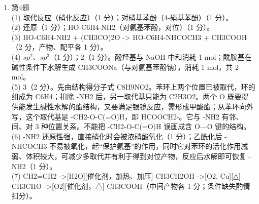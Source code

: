 \documentclass[UTF8,a4paper,zihao=5,oneside,openany,fontset=none]{ctexbook}
\def\mathrm#1{#1}\def\text#1{#1}\def\ensuremath#1{#1}\def\ce#1{#1}%
\renewcommand{\chaptermark}[1]{\markboth{第\,\thechapter\,章\quad #1}{}}
\newenvironment{jiexilist}{\small\begin{enumerate}[label={\textbf{\arabic*}.},leftmargin=1.6em,itemsep=0.3em,topsep=0.2em]}{\end{enumerate}}
\begin{document}
\begin{jiexilist}
\item 第4题\\
(1) 取代反应（硝化反应）（1 分）；对硝基苯酚（4-硝基苯酚）（1 分）。\\
(2) 还原（1 分）；\ce{HO-C6H4-NH2}（对氨基苯酚，对位）（1 分）。\\
(3) \ce{HO-C6H4-NH2 + (CH3CO)2O -> HO-C6H4-NHCOCH3 + CH3COOH}（2 分，产物、配平各 1 分）。\\
(4) $\mathrm{sp}^2$、$\mathrm{sp}^3$（1 分）；2（1 分）。酚羟基与 NaOH 中和消耗 1 mol；酰胺基在碱性条件下水解生成 \ce{CH3COONa}（与对氨基苯酚钠），消耗 1 mol，共 2 mol。\\
(5) 3（2 分）。先由结构得分子式 \ce{C8H9NO2}。苯环上两个位置已被取代，环的组成为 \ce{C6H4}；扣除 \ce{-NH2} 后，另一取代基只能为 \ce{C2H3O2}。两个 O 既要提供能发生碱性水解的酯结构，又要满足银镜反应，需形成甲酸酯；从苯环向外写，这个取代基是 \ce{-CH2-O-C(=O)H}，即 \ce{HCOOCH2-}。它与 \ce{-NH2} 有邻、间、对 3 种位置关系。不能把 \ce{-CH2-O-C(=O)H} 误画成含 O—O 键的结构。\\
(6) \ce{-NH2} 还原性强，直接硝化时会被浓硝酸氧化（1 分）；乙酰化后 \ce{-NHCOCH3} 不易被氧化，起“保护氨基”的作用，同时它对苯环的活化作用减弱、体积较大，可减少多取代并有利于得到对位产物，反应后水解即可恢复 \ce{-NH2}（1 分）。\\
(7) \ce{CH2=CH2 ->[H2O][\text{催化剂，加热、加压}] CH3CH2OH ->[O2, Cu][\text{△}] CH3CHO ->[O2][\text{催化剂，△}] CH3COOH}（中间产物各 1 分；条件缺失酌情扣分）。
\end{jiexilist}
\appendix
\renewcommand{\chaptermark}[1]{\markboth{附录\,\thechapter\quad #1}{}}
\end{document}
